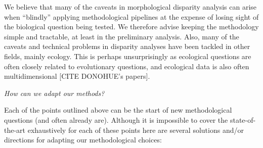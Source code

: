 \documentclass[12pt,letterpaper]{article}
\renewcommand{\subsection}[1]{%
\bigskip
\begin{center}
\begin{large}
\normalfont\itshape #1
\end{large}
\end{center}}
\begin{document}
We believe that many of the caveats in morphological disparity analysis can arise when ``blindly'' applying methodological pipelines at the expense of losing sight of the  biological question being tested.
We therefore advise keeping the methodology simple and tractable, at least in the preliminary analysis.
Also, many of the caveats and technical problems in disparity analyses have been tackled in other fields, mainly ecology.
This is perhaps unsurprisingly as ecological questions are often closely related to evolutionary questions, and ecological data is also often multidimensional [CITE DONOHUE's papers].

\subsection{How can we adapt our methods?}
Each of the points outlined above can be the start of new methodological questions (and often already are).
Although it is impossible to cover the state-of-the-art exhaustively for each of these points here are several solutions and/or directions for adapting our methodological choices:
\end{document}
